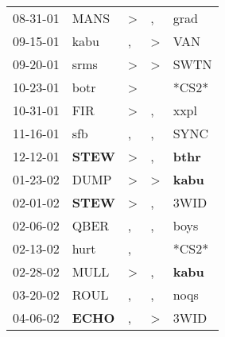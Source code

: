 \begin{supertabular}{p{0.07\textwidth}p{0.06\textwidth}p{0.02\textwidth}p{0.02\textwidth}p{0.06\textwidth}}
          08-31-01\textsuperscript{} &           MANS\textsuperscript{} &     \textgreater &                , &           grad\textsuperscript{} \\
          09-15-01\textsuperscript{} &           kabu\textsuperscript{} &                , &     \textgreater &            VAN\textsuperscript{} \\
          09-20-01\textsuperscript{} &           srms\textsuperscript{} &     \textgreater &     \textgreater &           SWTN\textsuperscript{} \\
          10-23-01\textsuperscript{} &           botr\textsuperscript{} &     \textgreater &                  &                            *CS2* \\
          10-31-01\textsuperscript{} &            FIR\textsuperscript{} &     \textgreater &                , &           xxpl\textsuperscript{} \\
          11-16-01\textsuperscript{} &            sfb\textsuperscript{} &                , &                , &           SYNC\textsuperscript{} \\
          12-12-01\textsuperscript{} &  \textbf{STEW\textsuperscript{}} &     \textgreater &                , &  \textbf{bthr\textsuperscript{}} \\
          01-23-02\textsuperscript{} &           DUMP\textsuperscript{} &     \textgreater &     \textgreater &  \textbf{kabu\textsuperscript{}} \\
          02-01-02\textsuperscript{} &  \textbf{STEW\textsuperscript{}} &     \textgreater &                , &           3WID\textsuperscript{} \\
          02-06-02\textsuperscript{} &           QBER\textsuperscript{} &                , &                , &           boys\textsuperscript{} \\
          02-13-02\textsuperscript{} &           hurt\textsuperscript{} &                , &                  &                            *CS2* \\
          02-28-02\textsuperscript{} &           MULL\textsuperscript{} &     \textgreater &                , &  \textbf{kabu\textsuperscript{}} \\
          03-20-02\textsuperscript{} &           ROUL\textsuperscript{} &                , &                , &           noqs\textsuperscript{} \\
          04-06-02\textsuperscript{} &  \textbf{ECHO\textsuperscript{}} &                , &     \textgreater &           3WID\textsuperscript{} \\

\end{supertabular}
